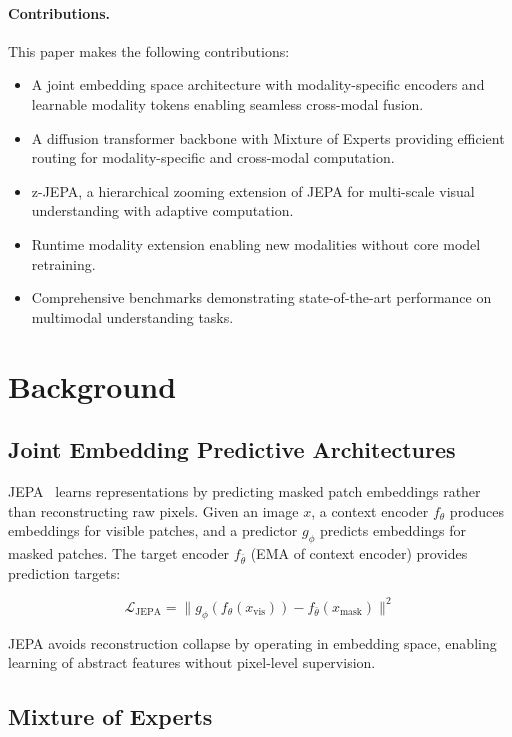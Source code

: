 \documentclass[11pt,twocolumn]{article}
\begin{document}
\paragraph{Contributions.} This paper makes the following contributions:
\begin{itemize}
    \item A joint embedding space architecture with modality-specific encoders and learnable modality tokens enabling seamless cross-modal fusion.
    \item A diffusion transformer backbone with Mixture of Experts providing efficient routing for modality-specific and cross-modal computation.
    \item z-JEPA, a hierarchical zooming extension of JEPA for multi-scale visual understanding with adaptive computation.
    \item Runtime modality extension enabling new modalities without core model retraining.
    \item Comprehensive benchmarks demonstrating state-of-the-art performance on multimodal understanding tasks.
\end{itemize}

\section{Background}

\subsection{Joint Embedding Predictive Architectures}

JEPA~\cite{jepa2022} learns representations by predicting masked patch embeddings rather than reconstructing raw pixels. Given an image $x$, a context encoder $f_\theta$ produces embeddings for visible patches, and a predictor $g_\phi$ predicts embeddings for masked patches. The target encoder $f_{\bar{\theta}}$ (EMA of context encoder) provides prediction targets:

\begin{equation}
    \mathcal{L}_{\text{JEPA}} = \|g_\phi(f_\theta(x_{\text{vis}})) - f_{\bar{\theta}}(x_{\text{mask}})\|^2
\end{equation}

JEPA avoids reconstruction collapse by operating in embedding space, enabling learning of abstract features without pixel-level supervision.

\subsection{Mixture of Experts}
\end{document}
